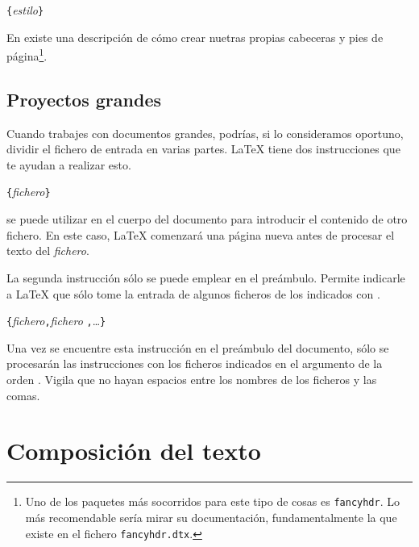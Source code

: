 \begin{command}
\verb|{|\emph{estilo}\verb|}|
\end{command}

En \companion{} existe  una descripción de cómo  crear nuetras propias
cabeceras y pies de página\footnote{Uno de los paquetes más socorridos
para  este tipo  de cosas  es \texttt{fancyhdr}.  Lo más  recomendable
sería mirar  su documentación,  fundamentalmente la  que existe  en el
fichero \texttt{fancyhdr.dtx}.}.

%
%

\subsection{Proyectos grandes}

Cuando trabajes  con documentos  grandes, podrías, si  lo consideramos
oportuno, dividir  el fichero  de entrada  en varias  partes. \LaTeX{}
tiene dos instrucciones que te ayudan a realizar esto.

\begin{command}
\verb|{|\emph{fichero}\verb|}|
\end{command}

\noindent se puede utilizar en el cuerpo del documento para introducir
el contenido  de otro  fichero. En este  caso, \LaTeX{}  comenzará una
página nueva antes de procesar el texto del \emph{fichero}.

La segunda instrucción sólo se  puede emplear en el preámbulo. Permite
indicarle a \LaTeX{}  que sólo tome la entrada de  algunos ficheros de
los indicados con \verb||.

\begin{command}
\verb|{|\emph{fichero}\verb|,|\emph{fichero}%
\verb|,|\ldots\verb|}|
\end{command}

Una vez se  encuentre esta instrucción en el  preámbulo del documento,
sólo  se procesarán  las instrucciones   con  los ficheros
indicados en el argumento de  la orden . Vigila que no
hayan espacios entre los nombres de los ficheros y las comas.



\section{Composición del texto}

